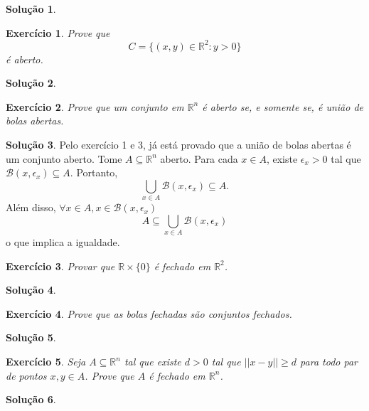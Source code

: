 \documentclass[a4paper,12pt]{article}
\newcommand{\R}{\mathbb{R}}
\newcommand{\B}{\mathcal{B}}
\theoremstyle{exer}
\newtheorem{exercise}{Exercício}
\theoremstyle{definition}
\newtheorem{solution}{Solução}
\theoremstyle{plain}
\begin{document}
\begin{solution}

\end{solution}

\begin{exercise}
    Prove que 
    $$C = \{(x, y) \in \R^2 : y > 0\}$$
    é aberto.
\end{exercise}

\begin{solution}
 
\end{solution}

\begin{exercise}
    Prove que um conjunto em $\R^n$ é aberto se, e somente se, é união de bolas abertas.
\end{exercise}

\begin{solution}
    Pelo exercício 1 e 3, já está provado que a união de bolas abertas é um
    conjunto aberto. Tome $A \subseteq \R^n$ aberto. Para cada $x \in A$,
    existe $\epsilon_x > 0$ tal que $\B(x, \epsilon_x) \subseteq A$. Portanto, 
    $$
    \bigcup_{x \in A} \B(x, \epsilon_x) \subseteq A. 
    $$
    Além disso, $\forall x \in A, x \in \B(x,\epsilon_x)$
    $$
    A \subseteq \bigcup_{x \in A} \B(x, \epsilon_x)
    $$
    o que implica a igualdade. 
\end{solution}

\begin{exercise}
    Provar que $\R \times \{0\}$ é fechado em $\R^2$.
\end{exercise}

\begin{solution}

\end{solution}

\begin{exercise}
    Prove que as bolas fechadas são conjuntos fechados.
\end{exercise}

\begin{solution}

\end{solution}

\begin{exercise}
    Seja $A \subseteq \R^n$ tal que existe $d > 0$ tal que $||x - y|| \ge d$
    para todo par de pontos $x, y \in A$. Prove que $A$ é fechado em $\R^n$.
\end{exercise}

\begin{solution}
  
\end{solution}
\end{document}
